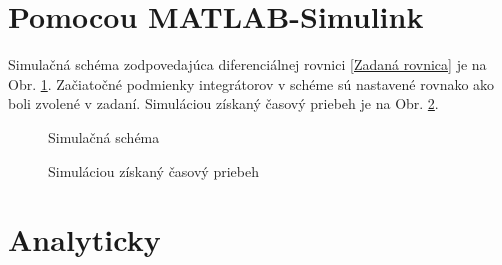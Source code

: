 \documentclass[a4paper, 10pt, ]{article}
\begin{document}
\section{Pomocou MATLAB-Simulink}

Simulačná schéma zodpovedajúca diferenciálnej rovnici \eqref{Zadaná rovnica} je na Obr. \ref{Simulačná schéma}. Začiatočné podmienky integrátorov v schéme sú nastavené rovnako ako boli zvolené v zadaní. Simuláciou získaný časový priebeh je na Obr. \ref{Simuláciou získaný časový priebeh}.

\begin{figure}[!ht]
	\centering


    \caption{Simulačná schéma}
	\label{Simulačná schéma}
\end{figure}




\begin{figure}[!ht]
	\centering


    \caption{Simuláciou získaný časový priebeh}
	\label{Simuláciou získaný časový priebeh}
\end{figure}









\section{Analyticky}
\end{document}
